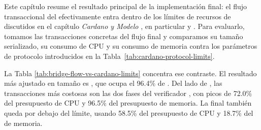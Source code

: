 
Este capítulo resume el resultado principal de la implementación final: el flujo transaccional del \zkBridge efectivamente entra dentro de los límites de recursos de \Cardano discutidos en el capítulo \emph{Cardano y Modelo \eUTxO}, en particular \maxTxSize y \maxTxExUnits. Para evaluarlo, tomamos las transacciones concretas del flujo final y comparamos su tamaño serializado, su consumo de CPU y su consumo de memoria contra los parámetros de protocolo introducidos en la Tabla~\ref{tab:cardano-protocol-limits}.

La Tabla \ref{tab:bridge-flow-vs-cardano-limits} concentra ese contraste. El resultado más ajustado en tamaño es \PublishPhaseOneReferenceScriptTx, que ocupa el 96.4\% de \maxTxSize. Del lado de \ExUnits, las transacciones más costosas son las dos fases del verificador \STM, con picos de 72.0\% del presupuesto de CPU y 96.5\% del presupuesto de memoria. La \BridgeMintTxTemplate final también queda por debajo del límite, usando 58.5\% del presupuesto de CPU y 18.7\% del de memoria.

